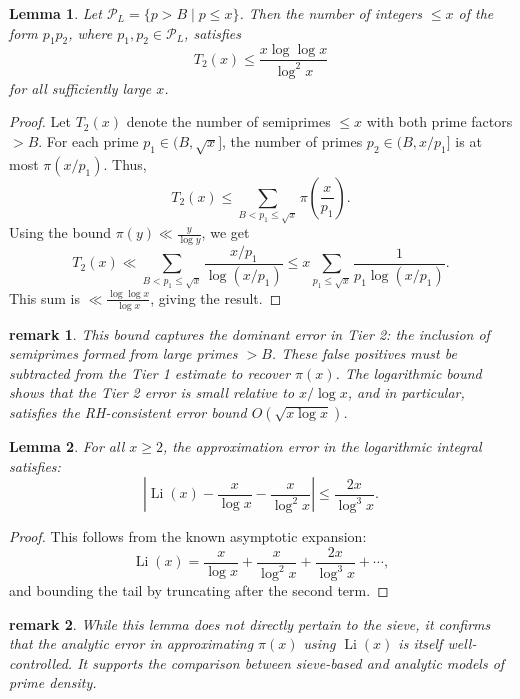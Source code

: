 \documentclass[11pt]{article}
\newtheorem{lemma}{Lemma}
\newtheorem{remark}{remark}
\begin{document}
	\begin{lemma}
		Let \( \mathcal{P}_L = \{ p > B \mid p \leq x \} \). Then the number of integers \( \leq x \) of the form \( p_1 p_2 \), where \( p_1, p_2 \in \mathcal{P}_L \), satisfies
		\[
		T_2(x) \leq \frac{x \log\log x}{\log^2 x}
		\]
		for all sufficiently large \( x \).
	\end{lemma}
	
	\begin{proof}
		Let \( T_2(x) \) denote the number of semiprimes \( \le x \) with both prime factors \( > B \). For each prime \( p_1 \in (B, \sqrt{x}] \), the number of primes \( p_2 \in (B, x/p_1] \) is at most \( \pi(x/p_1) \). Thus,
		\[
		T_2(x) \le \sum_{B < p_1 \le \sqrt{x}} \pi\left(\frac{x}{p_1}\right).
		\]
		Using the bound \( \pi(y) \ll \frac{y}{\log y} \), we get
		\[
		T_2(x) \ll \sum_{B < p_1 \le \sqrt{x}} \frac{x/p_1}{\log(x/p_1)} \le x \sum_{p_1 \le \sqrt{x}} \frac{1}{p_1 \log(x/p_1)}.
		\]
		This sum is \( \ll \frac{\log\log x}{\log x} \), giving the result.
	\end{proof}
	
	\begin{remark}
		This bound captures the dominant error in Tier 2: the inclusion of semiprimes formed from large primes \( > B \). These false positives must be subtracted from the Tier 1 estimate to recover \( \pi(x) \). The logarithmic bound shows that the Tier 2 error is small relative to \( x / \log x \), and in particular, satisfies the RH-consistent error bound \( O(\sqrt{x \log x}) \).
	\end{remark}
	
	\begin{lemma}
		For all \( x \geq 2 \), the approximation error in the logarithmic integral satisfies:
		\[
		\left| \operatorname{Li}(x) - \frac{x}{\log x} - \frac{x}{\log^2 x} \right| \leq \frac{2x}{\log^3 x}.
		\]
	\end{lemma}
	
	\begin{proof}
		This follows from the known asymptotic expansion:
		\[
		\operatorname{Li}(x) = \frac{x}{\log x} + \frac{x}{\log^2 x} + \frac{2x}{\log^3 x} + \cdots,
		\]
		and bounding the tail by truncating after the second term.
	\end{proof}
	
	\begin{remark}
		While this lemma does not directly pertain to the sieve, it confirms that the analytic error in approximating \( \pi(x) \) using \( \operatorname{Li}(x) \) is itself well-controlled. It supports the comparison between sieve-based and analytic models of prime density.
	\end{remark}
	
\end{document}
